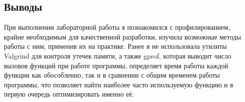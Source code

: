 \documentclass[12pt]{article}
\begin{document}
\subsection*{Выводы}

При выполнении лабораторной работы я познакомился с профилированием, крайне
необходимым для качественной разработки, изучила возможные методы работы с ним,
применив их на практике. Ранее я не использовала утилиты Valgrind для контроля
утечек памяти, а также gprof, которая выводит число вызовов функций при работе
программы, определяет время работы каждой функции как обособленно, так и в сравнении
с общим временем работы программы, что позволяет найти наиболее часто используемую
функцию и в первую очередь оптимизировать именно её.
\end{document}
